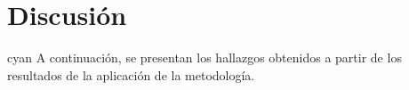 \documentclass[runningheads]{llncs}
\def \bchregi {\begin{color}{red}}
\def \echregi {\end{color}}
\def \bchgon {\begin{color}{blue}}
\def \echgon {\end{color}}
\def \bchedel {\begin{color}{cyan}}
\def \echedel {\end{color}}
\begin{document}

\section{Discusión}
\bchedel
A continuación, se presentan los hallazgos obtenidos a partir de los resultados de la aplicación de la metodología.
\echedel 
\end{document}
